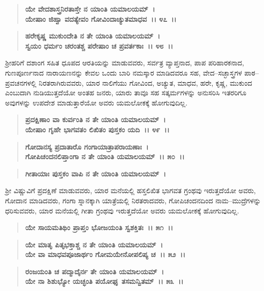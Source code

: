 \begin{verse}
\textbf{ಯೇ ವೇದಶಾಸ್ತ್ರನಿರತಾಸ್ತೇ ನ ಯಾಂತಿ ಯಮಾಲಯಮ್~।}\\\textbf{ಯೇಷಾಂ ಜಿಹ್ವಾ ವದತ್ಯೇವಂ ಗೋವಿಂದಾಚ್ಯುತಮಾಧವ~।। ೪೭~।।}
\end{verse}

\begin{verse}
\textbf{ಹರೇಕೃಷ್ಣ ಮುಕುಂದೇತಿ ನ ತೇ ಯಾಂತಿ ಯಮಾಲಯಮ್~।}\\\textbf{ಸ್ವಯಂ ಧರ್ಮಂ ಚರಂತಶ್ಚ ಪರೇಷಾಂ ಚ ಪ್ರವರ್ತಕಾಃ~।। ೪೮~।।}
\end{verse}

ಶ‍್ರೀಹರಿಗೆ ದಶಾಂಗ ಸಹಿತ ಧೂಪದ ಆರತಿಯನ್ನು ಮಾಡುವವರು, ಸರ್ವತ್ರ ವ್ಯಾಪ್ತನಾದ, ಪಾಪ ಪರಿಹಾರಕನಾದ, ಗುಣಪೂರ್ಣನಾದ ನಾರಾಯಣನನ್ನು ಕೇವಲ ಒಂದು ಬಾರಿ ನಮಸ್ಕಾರ ಮಾಡಿದವರೂ ಸಹ, ವೇದ–ಸಚ್ಛಾಸ್ತ್ರಗಳ ಪಾಠ–ಪ್ರವಚನಗಳಲ್ಲಿ ನಿರತರಾಗಿರುವವರು, ಯಾರ ನಾಲಿಗೆಯು ಗೋವಿಂದ, ಅಚ್ಯುತ, ಮಾಧವ, ಹರೇ, ಕೃಷ್ಣ, ಮುಕುಂದ ಎಂಬುದಾಗಿ ನುಡಿಯುತ್ತದೆಯೋ ಅಂತಹ ಜನರು, ಯಾರು ತಾವೂ ಸಹ ಸತ್ಕರ್ಮಗಳನ್ನು ಅನುಸರಿಸಿ ಇತರರಿಗೂ ಅವುಗಳನ್ನು ಉಪದೇಶ ಮಾಡುತ್ತಾರೆಯೋ ಅವರು ಯಮಲೋಕಕ್ಕೆ ಹೋಗುವುದಿಲ್ಲ.

\begin{verse}
\textbf{ಪ್ರದಕ್ಷಿಣಾಂ ವಾ ಕುರ್ವಂತಿ ನ ತೇ ಯಾಂತಿ ಯಮಾಲಯಮ್~।}\\\textbf{ಯೇಷಾಂ ಗೃಹೇ ಭಾಗವತಂ ಲಿಖಿತಂ ಪುಸ್ತಕಂ ಯದಿ~।। ೪೯~।। }
\end{verse}

\begin{verse}
\textbf{ಗೋದಾನಸ್ಯ ಪ್ರದಾತಾರೊ ಗಂಗಾಯಾತ್ರಾಪರಾಯಣಾಃ~।}\\\textbf{ಗೋಪಿಚಂದನಲಿಪ್ತಾಂಗಾ ನ ತೇ ಯಾಂತಿ ಯಮಾಲಯಮ್~।। ೫೦~।। }
\end{verse}

\begin{verse}
\textbf{ಗೀತಾಯಾಃ ಪುಸ್ತಕಂ ವಾಪಿ ನ ತೇ ಯಾಂತಿ ಯಮಾಲಯಮ್~।}
\end{verse}

ಶ‍್ರೀ ವಿಷ್ಣುವಿಗೆ ಪ್ರದಕ್ಷಿಣೆ ಮಾಡುವವರು, ಯಾರ ಮನೆಯಲ್ಲಿ ಹಸ್ತಲಿಖಿತ ಭಾಗವತ ಗ್ರಂಥವು ಇರುತ್ತದೆಯೋ ಅವರು, ಗೋದಾನ ಮಾಡಿದವರು, ಗಂಗಾ ಸ್ನಾನಕ್ಕಾಗಿ ಯಾತ್ರೆಯಲ್ಲಿ ನಿರತರಾದವರು, ಗೋಪಿಚಂದನದಿಂದ ನಾಮ–ಮುದ್ರೆಗಳನ್ನು ಧರಿಸುವವರು, ಯಾರ ಮನೆಯಲ್ಲಿ ಗೀತಾ ಗ್ರಂಥವು ಇರುತ್ತದೆಯೋ ಅವರು ಯಮಲೋಕಕ್ಕೆ ಹೋಗುವುದಿಲ್ಲ.

\begin{verse}
\textbf{ಯೇ ಸಾಯಮತಿಥಿಂ ಪ್ರಾಪ್ತಂ ಭೋಜಯಂತಿ ಸ್ವಶಕ್ತಿತಃ~।। ೫೧~।।} 
\end{verse}

\begin{verse}
\textbf{ಯೇ ಮಾತೃ ಪಿತೃಭಕ್ತಾಶ್ಚ ನ ತೇ ಯಾಂತಿ ಯಮಾಲಯಮ್~।}\\\textbf{ಯೇ ವಾ ಮಾಧವಪೂಜಾರ್ಥಂ ಗೋಮಯೇನೋಪಲಿಪ್ಯ ಚ~।। ೫೨~।। }
\end{verse}

\begin{verse}
\textbf{ರಂಜಯಂತಿ ಚ ಪದ್ಮಾದೈರ್ನ ತೇ ಯಾಂತಿ ಯಮಾಲಯಮ್~।}\\\textbf{ಯೇ ನಾ ಶಿಶುಭ್ಯೋ ಯಚ್ಛಂತಿ ಪಯೋಘೃ ತಸಮನ್ವಿತಮ್~।। ೫೩~।।}
\end{verse}

